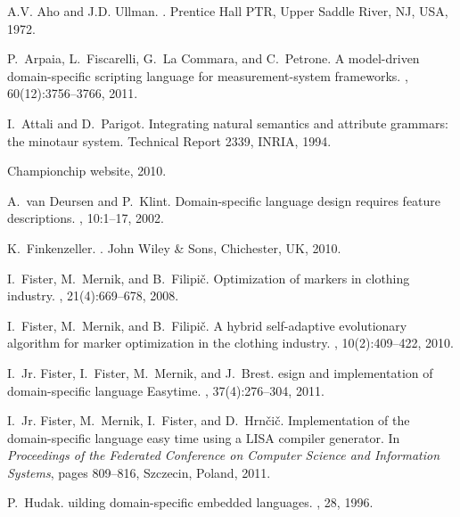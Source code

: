 \documentclass[preprint, prX]{revtex4}
\begin{document}
\begin{thebibliography}{10}

A.V. Aho and J.D. Ullman.
.
\newblock Prentice Hall PTR, Upper Saddle River, NJ, USA, 1972.

P.~Arpaia, L.~Fiscarelli, G.~{La Commara}, and C.~Petrone.
\newblock A model-driven domain-specific scripting language for
  measurement-system frameworks.
,
  60(12):3756--3766, 2011.

I.~Attali and D.~Parigot.
\newblock Integrating natural semantics and attribute grammars: the minotaur
  system.
\newblock Technical Report 2339, INRIA, 1994.

Championchip website, 2010.

{A.~van} Deursen and P.~Klint.
\newblock Domain-specific language design requires feature descriptions.
, 10:1--17,
  2002.

K.~Finkenzeller.
.
\newblock John Wiley \& Sons, Chichester, UK, 2010.

I.~Fister, M.~Mernik, and B.~Filipi\v{c}.
\newblock Optimization of markers in clothing industry.
,
  21(4):669--678, 2008.

I.~Fister, M.~Mernik, and B.~Filipi\v{c}.
\newblock A hybrid self-adaptive evolutionary algorithm for marker optimization
  in the clothing industry.
, 10(2):409--422, 2010.

I.~Jr. Fister, I.~Fister, M.~Mernik, and J.~Brest.
esign and implementation of domain-specific language {E}asytime.
, 37(4):276--304,
  2011.

I.~Jr. Fister, M.~Mernik, I.~Fister, and D.~Hrn\v{c}i\v{c}.
\newblock Implementation of the domain-specific language easy time using a
  {LISA} compiler generator.
\newblock In {\em Proceedings of the Federated Conference on Computer Science
  and Information Systems}, pages 809--816, Szczecin, Poland, 2011.

P.~Hudak.
uilding domain-specific embedded languages.
, 28, 1996.


\end{thebibliography}
\end{document}
